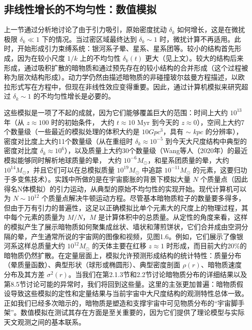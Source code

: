 
 

\subsection{非线性增长的不均匀性：数值模拟}

上一节通过分析地讨论了由于引力吸引，原始密度扰动 \( \delta_k \) 如何增长，这是在微扰极限 \( \delta_k \ll 1 \) 下的情况。当过密区域最终达到 \( \delta_k \sim 1 \) 时，微扰计算不再适用。此时，开始形成引力束缚系统：银河系子晕、星系、星系团等。较小的结构首先形成，因为在较小尺度 \( 1/k \) 上的不均匀性 \( \delta_k(t) \) 更大（见上文）。较大的结构后来形成，通过吸积扩散的暗物质和通过预先存在的较小结构的合并形成（这个过程被称为层次结构形成）。动力学仍然由描述暗物质的非碰撞玻尔兹曼方程描述，以欧拉形式写在方程中，但现在非线性效应变得重要。因此，通过计算机模拟来研究超过 \( \delta_k \sim 1 \) 的不均匀性增长是必要的。

这些模拟是一项了不起的成就，因为它们能够覆盖巨大的范围：时间上大约 \( 10^{13} \) 年（从 \( z \approx 100 \) 时的初始条件，
大约 \( t \approx 10 \) Myr 到今天的 \( z \approx 0 \)），空间上大约7个数量级（一些最近的模拟处理的体积大约是 $10 Gpc^3$，具有 \( \sim \) $kpc$ 的分辨率），密度对比度上大约11个数量级（从在重组时 \( \delta_k \approx 10^{-5} \) 到今天大尺度结构中典型的密度对比度 \( \delta_k \approx 10^6 \)），以及质量上大约30个数量级（Wang等人（2020年）的最近模拟能够同时解析地球质量的晕，
大约 \( 10^{-6} M_{\odot} \)，和星系团质量的晕，大约 \( 10^{14} M_{\odot} \)，并且它们可以在总模拟质量 \( 10^{19} M_{\odot} \) 中追踪 \( 10^{-11} M_{\odot} \) 的元素，这要归功于多变焦技术）。实践中所做的是在宇宙膨胀的背景下模拟大量 \( N \) 个质量点（因此得名N体模拟）的引力运动，从典型的原始不均匀性的实现开始。现代计算机可以为 \( N \sim 10^{12} \) 个质量点解决牛顿运动方程。尽管基本暗物质粒子的数量要多得多，但由于万有引力的普遍性，这足以正确模拟比单个元素大的尺度上的物理过程，其中每个元素的质量为 \( M/N \)，\( M \) 是计算体积中的总质量。从定性的角度来看，这样的模拟产生了展示暗物质如何聚集成丝状、墙状和薄煎饼状，它们合并成由空洞分隔的晕，产生通常所说的宇宙网的图像和视频，见图1.6。例如，它们展示了像银河系这样总质量大约 \( 10^{12} M_{\odot} \) 的天体主要在红移 \( z \approx 1 \) 时形成，而目前大约20\%的暗物质仍然扩散。在定量层面上，模拟允许预测形成结构的统计特性：质量分布（晕质量函数）、典型形状（球形或椭圆形）、典型密度剖面 \( \rho(r) \)、暗物质速度分布及其方差 \( \sigma^2(r) \)。当我们在第2.1.3节和2.2节讨论暗物质分布的详细结果以及第8.5节讨论可能的异常时，我们将回到这些量。这里的主张更加普遍：暗物质假设导致这些模拟的定性和定量结果与当前宇宙中大尺度结构的观测特性总体一致。正如我们已经多次暗示的，暗物质是塑造和支撑宇宙中可见物质分布的“宇宙脚手架”。数值模拟在测试其存在方面是至关重要的，因为它们提供了理论模型与实际天文观测之间的基本联系。

